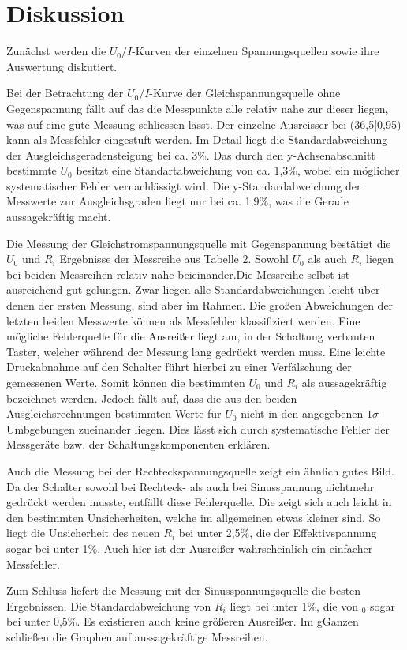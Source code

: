 \section{Diskussion}
\label{sec:Diskussion}


Zunächst werden die $U_0/I $-Kurven der einzelnen Spannungsquellen sowie ihre Auswertung diskutiert.

Bei der Betrachtung der $U_0 /I$-Kurve der Gleichspannungsquelle ohne Gegenspannung
fällt auf das die Messpunkte alle relativ nahe zur dieser liegen, was auf eine gute
Messung schliessen lässt. Der einzelne Ausreisser bei (36,5|0,95) kann als Messfehler
eingestuft werden.
 Im Detail liegt die Standardabweichung der Ausgleichsgeradensteigung bei ca. 3\%. Das durch den
 y-Achsenabschnitt bestimmte $U_0$ besitzt eine Standartabweichung von ca. 1,3\%, wobei ein möglicher
 systematischer Fehler vernachlässigt wird.
 Die y-Standardabweichung der Messwerte zur Ausgleichsgraden liegt nur bei ca. 1,9\%,
  was die Gerade aussagekräftig macht.

Die Messung der Gleichstromspannungsquelle mit Gegenspannung bestätigt die $U_0$ und $R_i$ Ergebnisse
der Messreihe aus Tabelle 2. Sowohl $U_0$ als auch $R_i$ liegen bei beiden Messreihen
 relativ nahe beieinander.Die Messreihe selbst ist ausreichend gut gelungen.
 Zwar liegen alle Standardabweichungen leicht über denen der ersten Messung,
 sind aber im Rahmen.
 Die großen Abweichungen der letzten beiden Messwerte können als Messfehler klassifiziert werden.
 Eine mögliche Fehlerquelle für die Ausreißer liegt am, in der Schaltung verbauten Taster,
  welcher während der Messung lang gedrückt werden muss. Eine leichte Druckabnahme auf den Schalter
  führt hierbei zu einer Verfälschung der gemessenen Werte.
 Somit können die bestimmten $U_0$ und $R_i$ als aussagekräftig bezeichnet werden.
 Jedoch fällt auf, dass die aus den beiden Ausgleichsrechnungen bestimmten Werte für $U_0$
 nicht in den angegebenen $1\sigma$-Umbgebungen zueinander liegen.
 Dies lässt sich durch systematische Fehler der Messgeräte bzw. der Schaltungskomponenten erklären.


Auch die Messung bei der Rechteckspannungsquelle zeigt ein ähnlich gutes Bild.
 Da  der Schalter sowohl bei Rechteck- als auch bei Sinusspannung nichtmehr gedrückt werden musste,
entfällt diese Fehlerquelle. Die zeigt sich auch leicht in den bestimmten Unsicherheiten,
welche im allgemeinen etwas kleiner sind. So liegt die Unsicherheit des neuen $R_i$ bei
unter 2,5\%, die der Effektivspannung sogar bei unter 1\%. Auch hier ist der Ausreißer wahrscheinlich
ein einfacher Messfehler.

Zum Schluss liefert die Messung mit der Sinusspannungsquelle die besten Ergebnissen.
Die Standardabweichung von $R_i$ liegt bei unter 1\%, die von $_0$ sogar bei unter 0,5\%.
 Es existieren auch keine größeren Ausreißer.
 Im gGanzen schließen die Graphen auf aussagekräftige Messreihen.
